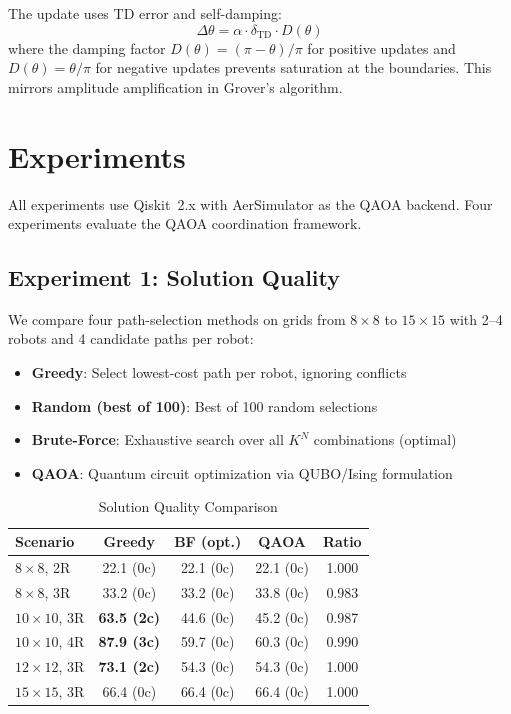 \documentclass[conference]{IEEEtran}
\begin{document}
The update uses TD error and self-damping:
\begin{equation}
    \Delta\theta = \alpha \cdot \delta_{\text{TD}} \cdot D(\theta)
\end{equation}
where the damping factor $D(\theta) = (\pi - \theta)/\pi$ for positive updates and $D(\theta) = \theta/\pi$ for negative updates prevents saturation at the boundaries. This mirrors amplitude amplification in Grover's algorithm.

\section{Experiments}
\label{sec:experiments}

All experiments use Qiskit~2.x with AerSimulator as the QAOA backend. Four experiments evaluate the QAOA coordination framework.

\subsection{Experiment 1: Solution Quality}

We compare four path-selection methods on grids from $8\times8$ to $15\times15$ with 2--4 robots and 4 candidate paths per robot:

\begin{itemize}
    \item \textbf{Greedy}: Select lowest-cost path per robot, ignoring conflicts
    \item \textbf{Random (best of 100)}: Best of 100 random selections
    \item \textbf{Brute-Force}: Exhaustive search over all $K^N$ combinations (optimal)
    \item \textbf{QAOA}: Quantum circuit optimization via QUBO/Ising formulation
\end{itemize}

\begin{table}[h]
\centering
\caption{Solution Quality Comparison}
\label{tab:exp1}
\begin{tabular}{@{}lcccc@{}}
\toprule
\textbf{Scenario} & \textbf{Greedy} & \textbf{BF (opt.)} & \textbf{QAOA} & \textbf{Ratio} \\
\midrule
$8\times8$, 2R  & 22.1 (0c) & 22.1 (0c) & 22.1 (0c) & 1.000 \\
$8\times8$, 3R  & 33.2 (0c) & 33.2 (0c) & 33.8 (0c) & 0.983 \\
$10\times10$, 3R & \textbf{63.5 (2c)} & 44.6 (0c) & 45.2 (0c) & 0.987 \\
$10\times10$, 4R & \textbf{87.9 (3c)} & 59.7 (0c) & 60.3 (0c) & 0.990 \\
$12\times12$, 3R & \textbf{73.1 (2c)} & 54.3 (0c) & 54.3 (0c) & 1.000 \\
$15\times15$, 3R & 66.4 (0c) & 66.4 (0c) & 66.4 (0c) & 1.000 \\
\bottomrule
\end{tabular}
\end{table}
\end{document}
